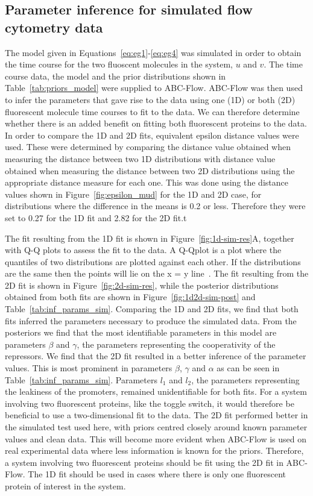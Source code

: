 \subsection{Parameter inference for simulated flow cytometry data}

The model given in Equations~\ref{eq:eg1}-\ref{eq:eg4} was simulated in order to obtain the time course for the two fluoscent molecules in the system, $u$ and $v$. The  time course data, the model and the prior distributions shown in Table~\ref{tab:priors_model} were supplied to ABC-Flow. ABC-Flow was then used to infer the parameters that gave rise to the data using one (1D) or both (2D) fluorescent molecule time courses to fit to the data. We can therefore determine whether there is an added benefit on fitting both fluorescent proteins to the data. In order to compare the 1D and 2D fits, equivalent epsilon distance values were used. These were determined by comparing the distance value obtained when measuring the distance between two 1D distributions with distance value obtained when measuring the distance between two 2D distributions using the appropriate distance measure for each one. This was done using the distance values shown in Figure~\ref{fig:epsilon_mud} for the 1D and 2D case, for distributions where the difference in the means is 0.2 or less. Therefore they were set to 0.27 for the 1D fit and 2.82 for the 2D fit.t

The fit resulting from the 1D fit is shown in Figure~\ref{fig:1d-sim-res}A, together with Q-Q plots to assess the fit to the data. A Q-Qplot is a plot where the quantiles of two distributions are plotted against each other. If the distributions are the same then the points will lie on the x = y line~\autocite{Wilk:1968ts}. The fit resulting from the 2D fit is shown in Figure~\ref{fig:2d-sim-res}, while the posterior distributions obtained from both fits are shown in Figure~\ref{fig:1d2d-sim-post} and Table~\ref{tab:inf_params_sim}. Comparing the 1D and 2D fits, we find that both fits inferred the parameters necessary to produce the simulated data. From the posteriors we find that the most identifiable parameters in this model are parameters $β$ and $γ$, the parameters representing the cooperativity of the repressors. We find that the 2D fit resulted in a better inference of the parameter values. This is most prominent in parameters $β$, $γ$ and $α$ as can be seen in Table~\ref{tab:inf_params_sim}. Parameters $l_1$ and $l_2$, the parameters representing the leakiness of the promoters,  remained unidentifiable for both fits. For a system involving two fluorescent proteins, like the toggle switch, it would therefore be beneficial to use a two-dimensional fit to the data. The 2D fit performed better in the simulated test used here, with priors centred closely around known parameter values and clean data. This will become more evident when ABC-Flow is used on real experimental data where less information is known for the priors. Therefore, a system involving two fluorescent proteins should be fit using the 2D fit in ABC-Flow. The 1D fit should be used in cases where there is only one fluorescent protein of interest in the system. 

